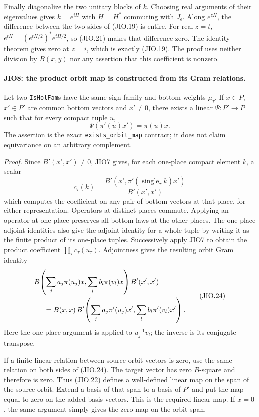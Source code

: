 Finally diagonalize the two unitary blocks of \(k\).  Choosing
real arguments of their eigenvalues gives \(k=e^{iH}\) with
\(H=H^*\) commuting with \(J_\epsilon\).
Along \(e^{zH}\), the difference between the two sides of
(JIO.19) is entire.  For real \(z=t\),
\(e^{tH}=(e^{tH/2})^*e^{tH/2}\), so (JIO.21) makes that
difference zero.  The identity theorem gives zero at \(z=i\),
which is exactly (JIO.19).  The proof uses neither division by
\(B(x,y)\) nor any assertion that this coefficient is nonzero.

\paragraph{JIO8: the product orbit map is constructed from its Gram relations.}
\label{claim:JIO8}
Let two \texttt{IsHolFam}s have the same sign family and
bottom weights \(\mu_\tau\).  If \(x\in P\), \(x'\in P'\) are
common bottom vectors and \(x'\ne0\), there exists a linear
\(\Psi:P'\to P\) such that for every compact tuple \(u\),
\[
                    \Psi(\pi'(u)x')=\pi(u)x.
 \tag{JIO.22}
\]
The assertion is the exact \texttt{exists\_orbit\_map} contract;
it does not claim equivariance on an arbitrary complement.

\emph{Proof.}
Since \(B'(x',x')\ne0\), JIO7 gives, for each one-place compact
element \(k\), a scalar
\[
        c_\tau(k)=
          \frac{B'(x',\pi'(\operatorname{single}_\tau k)x')}
               {B'(x',x')}
 \tag{JIO.23}
\]
which computes the coefficient on any pair of bottom vectors
at that place, for either representation.
Operators at distinct places commute.  Applying an operator at
one place preserves all bottom laws at the other places.
The one-place adjoint identities also give the adjoint identity
for a whole tuple by writing it as the finite product of its
one-place tuples.
Successively apply JIO7 to obtain the product coefficient
\(\prod_\tau c_\tau(u_\tau)\).
Adjointness gives the resulting orbit Gram identity
\[
 \begin{split}
 &B\!\left(\sum_j a_j\pi(u_j)x,\sum_l b_l\pi(v_l)x\right)
                         B'(x',x')\\
 &\hspace{5mm}=
 B(x,x)\,
 B'\!\left(\sum_j a_j\pi'(u_j)x',
                         \sum_l b_l\pi'(v_l)x'\right).
 \end{split}
 \tag{JIO.24}
\]
Here the one-place argument is applied to \(u_j^{-1}v_l\);
the inverse is its conjugate transpose.

If a finite linear relation between source orbit vectors is zero,
use the same relation on both sides of (JIO.24).  The target
vector has zero \(B\)-square and therefore is zero.  Thus (JIO.22)
defines a well-defined linear map on the span of the source
orbit.  Extend a basis of that span to a basis of \(P'\) and put
the map equal to zero on the added basis vectors.  This is the
required linear map.  If \(x=0\), the same argument simply gives
the zero map on the orbit span.

